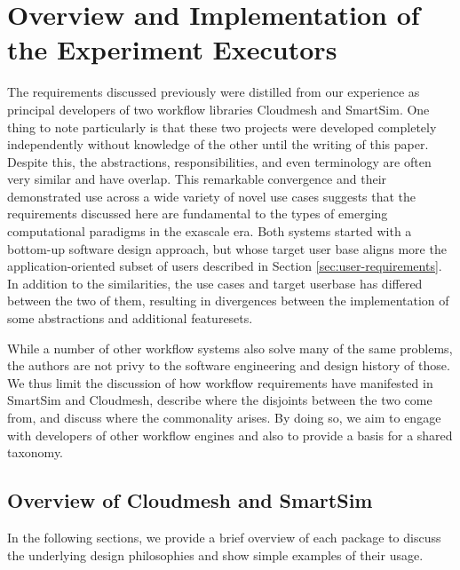 \documentclass[sigconf]{acmart}
\begin{document}
\begin{BOX}
\end{BOX}


\section{Overview and Implementation of the Experiment Executors}
\label{sec:executors}

The requirements discussed previously were distilled from our experience as principal developers of two workflow libraries Cloudmesh and SmartSim. One thing to note particularly is that these two projects were developed completely independently without knowledge of the other until the writing of this paper. Despite this, the abstractions, responsibilities, and even terminology are often very similar and have overlap. This remarkable convergence and their demonstrated use across a wide variety of novel use cases suggests that the requirements discussed here are fundamental to the types of emerging computational paradigms in the exascale era. Both systems started with a bottom-up software design approach, but whose target user base aligns more the application-oriented subset of users described in Section \ref{sec:user-requirements}. In addition to the similarities, the use cases and target userbase has differed between the two of them, resulting in divergences between the implementation of some abstractions and additional featuresets.

While a number of other workflow systems also solve many of the same problems, the authors are not privy to the software engineering and design history of those. We thus limit the discussion of how workflow requirements have manifested in SmartSim and Cloudmesh, describe where the disjoints between the two come from, and discuss where the commonality arises. By doing so, we aim to engage with developers of other workflow engines and also to provide a basis for a shared taxonomy.

\subsection{Overview of Cloudmesh and SmartSim}

In the following sections, we provide a brief overview of each package to discuss the underlying design philosophies and show simple examples of their usage. 
\end{document}

